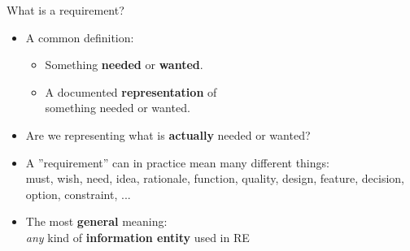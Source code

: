 
\begin{Slide}{What is a requirement?}

\begin{itemize}
\item A common definition:
\begin{itemize}
\item Something \textbf{needed} or \textbf{wanted}.
\item A documented \textbf{representation} of\\something needed or wanted.

\end{itemize}
\item Are we representing what is \textbf{actually} needed or wanted? 

\item A ''requirement'' can in practice mean many different things:\\
  must, wish, need, idea, rationale, function, quality, design, feature, decision, option, constraint, ...

\item The most \textbf{general} meaning:\\
  \textit{any} kind of \textbf{information entity} used in RE

\end{itemize}
\end{Slide}